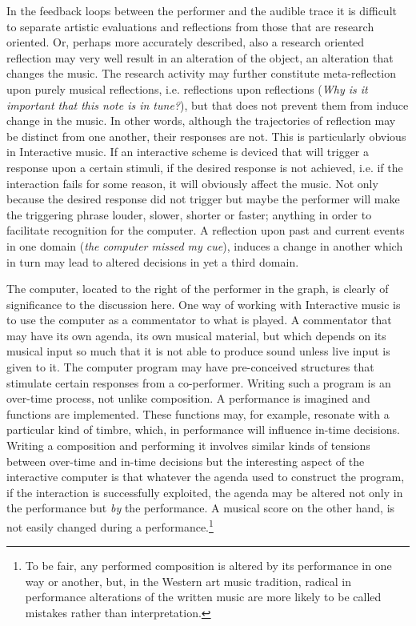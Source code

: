 In the feedback loops between the performer and the audible trace it is difficult to separate artistic evaluations and reflections from those that are research oriented. Or, perhaps more accurately described, also a research oriented reflection may very well result in an alteration of the object, an alteration that changes the music. The research activity may further constitute meta-reflection upon purely musical reflections, i.e. reflections upon reflections (\emph{Why is it important that this note is in tune?}), but that does not prevent them from induce change in the music. In other words, although the trajectories of reflection may be distinct from one another, their responses are not. This is particularly obvious in Interactive music. If an interactive scheme is deviced that will trigger a response upon a certain stimuli, if the desired response is not achieved, i.e. if the interaction fails for some reason, it will obviously affect the music. Not only because the desired response did not trigger but maybe the performer will make the triggering phrase louder, slower, shorter or faster; anything in order to facilitate recognition for the computer. A reflection upon past and current events in one domain (\emph{the computer missed my cue}), induces a change in another which in turn may lead to altered decisions in yet a third domain.

The computer, located to the right of the performer in the graph, is clearly of significance to the discussion here. One way of working with Interactive music is to use the computer as a commentator to what is played. A commentator that may have its own agenda, its own musical material, but which depends on its musical input so much that it is not able to produce sound unless live input is given to it. The computer program may have pre-conceived structures that stimulate certain responses from a co-performer. Writing such a program is an over-time process, not unlike composition. A performance is imagined and functions are implemented. These functions may, for example, resonate with a particular kind of timbre, which, in performance will influence in-time decisions. 
Writing a composition and performing it involves similar kinds of tensions between over-time and in-time decisions but the interesting aspect of the interactive computer is that whatever the agenda used to construct the program, if the interaction is successfully exploited, the agenda may be altered not only in the performance but \emph{by} the performance. A musical score on the other hand, is not easily changed during a performance.\footnote{To be fair, any performed composition is altered by its performance in one way or another, but, in the Western art music tradition, radical in performance alterations of the written music are more likely to be called mistakes rather than interpretation.}  

